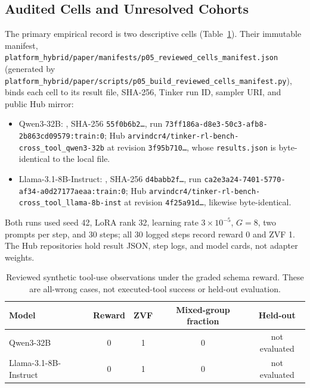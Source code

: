 \subsection{Audited Cells and Unresolved Cohorts}
\label{sec:evidence-identity}
The primary empirical record is two descriptive cells
(Table~\ref{tab:audited-tool-cells}). Their immutable manifest,
\texttt{platform\_hybrid/paper/manifests/p05\_reviewed\_cells\_manifest.json}
(generated by
\texttt{platform\_hybrid/paper/scripts/p05\_build\_reviewed\_cells\_manifest.py}),
binds each cell to its result file, SHA-256, Tinker run ID, sampler URI, and
public Hub mirror:
\begin{itemize}[leftmargin=*,itemsep=1pt]
\item Qwen3-32B:
,
SHA-256 \texttt{55f0b6b2\dots}, run \texttt{73ff186a-d8e3-50c3-afb8-2b863cd09579:train:0};
Hub \texttt{arvindcr4/tinker-rl-bench-cross\_tool\_qwen3-32b} at revision
\texttt{3f95b710\dots}, whose \texttt{results.json} is byte-identical to the local file.
\item Llama-3.1-8B-Instruct:
, SHA-256 \texttt{d4babb2f\dots},
run \texttt{ca2e3a24-7401-5770-af34-a0d27177aeaa:train:0}; Hub
\texttt{arvindcr4/tinker-rl-bench-cross\_tool\_llama-8b-inst} at revision
\texttt{4f25a91d\dots}, likewise byte-identical.
\end{itemize}
Both runs used seed 42, LoRA rank 32, learning rate $3\times10^{-5}$, $G=8$,
two prompts per step, and 30 steps; all 30 logged steps record reward 0 and
ZVF 1. The Hub repositories hold result JSON, step logs, and model cards, not
adapter weights.

\begin{table}[htbp]
\centering\small
\caption{Reviewed synthetic tool-use observations under the graded schema reward.
These are all-wrong cases, not executed-tool success or held-out evaluation.}
\label{tab:audited-tool-cells}
\begin{tabular}{lcccc}
\toprule
Model & Reward & ZVF & Mixed-group fraction & Held-out \\
\midrule
Qwen3-32B & 0 & 1 & 0 & not evaluated \\
Llama-3.1-8B-Instruct & 0 & 1 & 0 & not evaluated \\
\bottomrule
\end{tabular}
\end{table}

